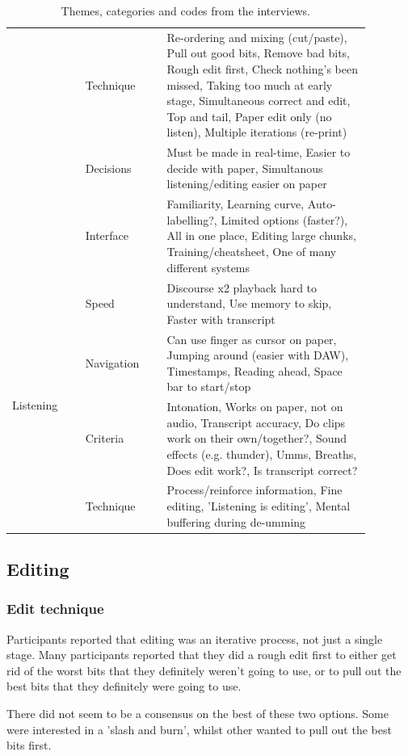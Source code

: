 \begin{table}[h]
{\begin{tabular}{|p{0.18\linewidth}|p{0.2\linewidth}|p{0.5\linewidth}|}
 & Technique & Re-ordering and mixing (cut/paste), Pull out good bits, Remove bad bits, Rough edit first, Check nothing's been missed, Taking too much at early stage, Simultaneous correct and edit, Top and tail, Paper edit only (no listen), Multiple iterations (re-print) \\ \cline{2-3}
 & Decisions & Must be made in real-time, Easier to decide with paper, Simultanous listening/editing easier on paper \\ \cline{2-3}
 & Interface & Familiarity, Learning curve, Auto-labelling?, Limited options (faster?), All in one place, Editing large chunks, Training/cheatsheet, One of many different systems \\ \hline
\multirow{4}{*}{Listening}
 & Speed & Discourse x2 playback hard to understand, Use memory to skip, Faster with transcript \\ \cline{2-3}
 & Navigation & Can use finger as cursor on paper, Jumping around (easier with DAW), Timestamps, Reading ahead, Space bar to start/stop \\ \cline{2-3}
 & Criteria & Intonation, Works on paper, not on audio, Transcript accuracy, Do clips work on their own/together?, Sound effects (e.g. thunder), Umms, Breaths, Does edit work?, Is transcript correct? \\ \cline{2-3}
 & Technique & Process/reinforce information, Fine editing, 'Listening is editing', Mental buffering during de-umming \\ \hline

\end{tabular}
}
\caption{Themes, categories and codes from the interviews.}
\label{tab:paper-codes}
\end{table}

\subsection{Editing}

\subsubsection{Edit technique}

Participants reported that editing was an iterative process, not just a single stage. Many participants reported that
they did a rough edit first to either get rid of the worst bits that they definitely weren't going to use, or to pull
out the best bits that they definitely were going to use.

There did not seem to be a consensus on the best of these two options. Some were interested in a 'slash and burn',
whilst other wanted to pull out the best bits first.

